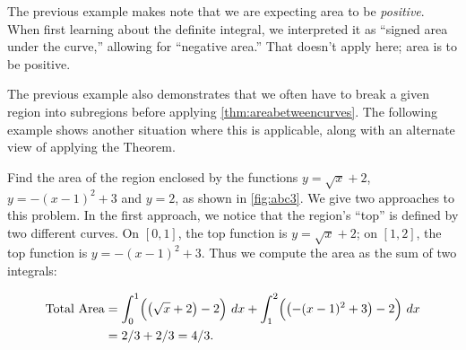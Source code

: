 The previous example makes note that we are expecting area to be \emph{positive}. When first learning about the definite integral, we interpreted it as ``signed area under the curve,'' allowing for ``negative area.'' That doesn't apply here; area is to be positive.

The previous example also demonstrates that we often have to break a given region into subregions before applying \autoref{thm:areabetweencurves}. The following example shows another situation where this is applicable, along with an alternate view of applying the Theorem.

\begin{example}\label{ex_abc3}
Find the area of the region enclosed by the functions $y=\sqrt{x}+2$, $y=-(x-1)^2+3$ and $y=2$, as shown in \autoref{fig:abc3}.
\solution
We give two approaches to this problem. In the first approach, we notice that the region's ``top'' is defined by two different curves. On $[0,1]$, the top function is $y=\sqrt{x}+2$; on $[1,2]$, the top function is $y=-(x-1)^2+3$. Thus we compute the area as the sum of two integrals:


\begin{align*}
	\text{Total Area}
	&= \int_0^1 \Bigl(\bigl(\sqrt{x}+2\bigr)-2\Bigr)\ dx + \int_1^2 \Bigl(\bigl(-(x-1)^2+3\bigr)-2\Bigr)\ dx \\
	&= 2/3 + 2/3
	=4/3.
\end{align*}


\end{example}
